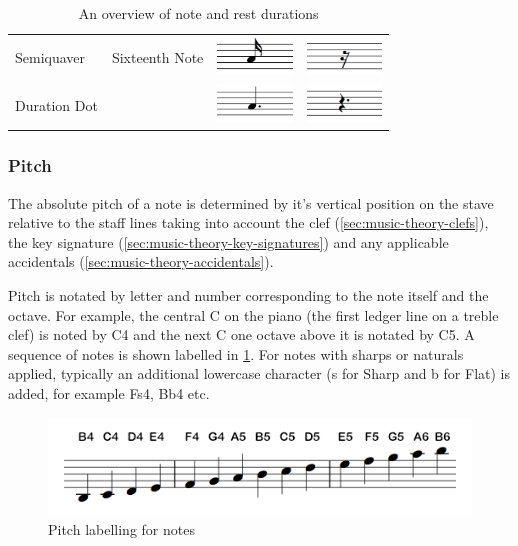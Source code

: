 \begin{table}[H]
\begin{tabularx}{.7\textwidth}{ llll }
        Semiquaver & Sixteenth Note & \includegraphics[height=1cm]{gfx/music-theory/notehead-semiquaver.png} & \includegraphics[height=1cm]{gfx/music-theory/rest-semiquaver.png}\\
        Duration Dot &              & \includegraphics[height=1cm]{gfx/music-theory/notehead-dotted.png}  & \includegraphics[height=1cm]{gfx/music-theory/rest-dotted.png} \\
        \bottomrule
    \end{tabularx}
    \caption{An overview of note and rest durations}
    \label{table:note-lengths}
\end{table}

\subsubsection{Pitch}
\label{sec:music-theory-pitch}

The absolute pitch of a note is determined by it's vertical position on the stave relative to the staff lines taking into account the clef (\cref{sec:music-theory-clefs}), the key signature (\cref{sec:music-theory-key-signatures}) and any applicable accidentals (\cref{sec:music-theory-accidentals}).

Pitch is notated by letter and number corresponding to the note itself and the octave. For example, the central C on the piano (the first ledger line on a treble clef) is noted by C4 and the next C one octave above it is notated by C5. A sequence of notes is shown labelled in \cref{fig:music-theory-pitch-labels}. For notes with sharps or naturals applied, typically an additional lowercase character (s for Sharp and b for Flat) is added, for example Fs4, Bb4 etc.

\begin{figure}[H]
  \centering
  \includegraphics[width=\linewidth]{gfx/music-theory/scale.png}
  \caption{Pitch labelling for notes}
  \label{fig:music-theory-pitch-labels}
\end{figure}

